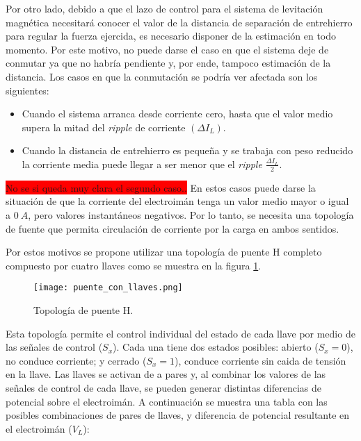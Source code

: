Por otro lado, debido a que el lazo de control para el sistema de levitación magnética necesitará conocer el valor de la distancia de separación de entrehierro para regular la fuerza ejercida, es necesario disponer de la estimación en todo momento. Por este motivo, no puede darse el caso en que el sistema deje de conmutar ya que no habría pendiente y, por ende, tampoco estimación de la distancia. Los casos en que la conmutación se podría ver afectada son los siguientes: 
\begin{itemize} 
	\item Cuando el sistema arranca desde corriente cero, hasta que el valor medio supera la mitad del \textsl{ripple} de corriente $(\Delta I_{L})$.
	
	\item Cuando la distancia de entrehierro es pequeña y se trabaja con peso reducido la corriente media puede llegar a ser menor que el \textsl{ripple} $\frac{\Delta I_{L}}{2}$.
\end{itemize}
\colorbox{red}{No se si queda muy clara el segundo caso..}
En estos casos puede darse la situación de que la corriente del electroimán tenga un valor medio mayor o igual a $0\:A$, pero valores instantáneos negativos. Por lo tanto, se necesita una topología de fuente que permita circulación de corriente por la carga en ambos sentidos.

Por estos motivos se propone utilizar una topología de puente H completo compuesto por cuatro llaves como se muestra en la figura \ref{fig:img_topologia_simplificada}.

\begin{figure}[H]
	\centering
	\texttt{[image: puente\_con\_llaves.png]}
	\caption{Topología de puente H.}
	\label{fig:img_topologia_simplificada}
\end{figure}

Esta topología permite el control individual del estado de cada llave por medio de las señales de control ($S_x$). Cada una tiene dos estados posibles: abierto ($S_x=0$), no conduce corriente; y cerrado ($S_x=1$), conduce corriente sin caida de tensión en la llave. Las llaves se activan de a pares y, al combinar los valores de las señales de control de cada llave, se pueden generar distintas diferencias de potencial sobre el electroimán. A continuación se muestra una tabla con las posibles combinaciones de pares de llaves, y diferencia de potencial resultante en el electroimán ($V_L$):

